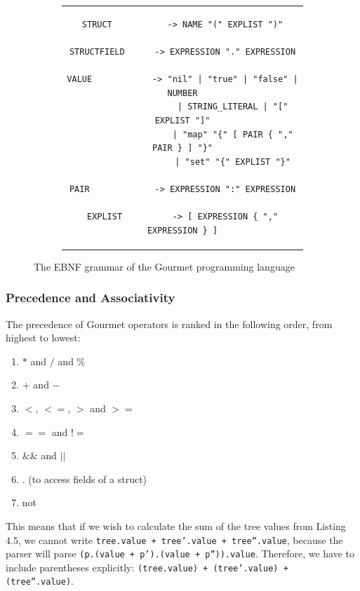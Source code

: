 \begin{figure}
    \begin{subfigure}[ht]{1\linewidth}
        \begin{tabular}{c}
            \begin{lstlisting}
STRUCT           -> NAME "(" EXPLIST ")"

STRUCTFIELD      -> EXPRESSION "." EXPRESSION

VALUE            -> "nil" | "true" | "false" | NUMBER
                    | STRING_LITERAL | "[" EXPLIST "]"
                    | "map" "{" [ PAIR { "," PAIR } ] "}"
                    | "set" "{" EXPLIST "}"

PAIR             -> EXPRESSION ":" EXPRESSION

EXPLIST          -> [ EXPRESSION { "," EXPRESSION } ]

            \end{lstlisting}
        \end{tabular}
    \end{subfigure}
    \setcounter{figure}{1}
    \caption{The EBNF grammar of the Gourmet programming language}
    \label{fig:gourmet-grammer1}
\end{figure}

\subsubsection{Precedence and Associativity}

The precedence of Gourmet operators is ranked in the following order, from highest to lowest:

\begin{enumerate}
    \item $*$ and $/$ and $\%$
    \item $+$ and $-$
    \item $<$, $<=$, $>$ and $>=$
    \item $==$ and $!=$
    \item $\&\&$ and $||$
    \item $.$ (to access fields of a struct)
    \item not
\end{enumerate}

This means that if we wish to calculate the sum of the tree values from Listing 4.5, we cannot write \texttt{tree.value + tree'.value + tree''.value}, because the parser will parse \texttt{(p.(value + p').(value + p'')).value}. Therefore, we have to include parentheses explicitly: \texttt{(tree.value) + (tree'.value) + (tree''.value)}. \hfill \\

